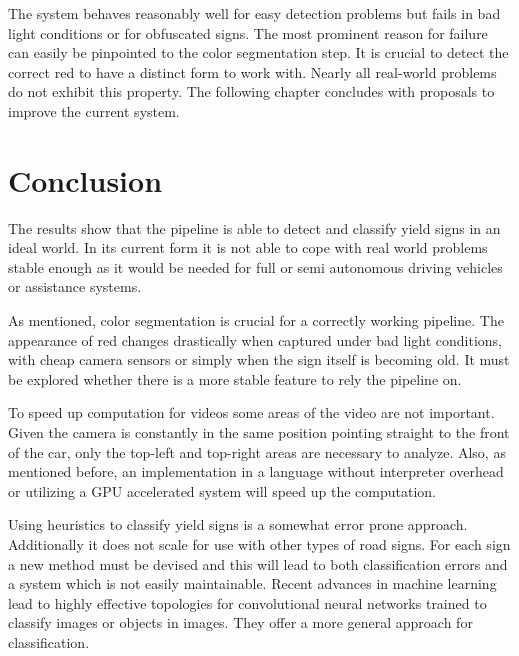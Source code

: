 \documentclass{report}
\begin{document}
The system behaves reasonably well for easy detection problems but
fails in bad light conditions or for obfuscated signs. The most
prominent reason for failure can easily be pinpointed to the color
segmentation step. It is crucial to detect the correct red to have a
distinct form to work with. Nearly all real-world problems do not
exhibit this property. The following chapter concludes with proposals
to improve the current system.


\pagebreak
\chapter{Conclusion}
\label{chap:conclusion}

The results show that the pipeline is able to detect and classify
yield signs in an ideal world. In its current form it is not able to
cope with real world problems stable enough as it would be needed for
full or semi autonomous driving vehicles or assistance systems.

As mentioned, color segmentation is crucial for a correctly working
pipeline. The appearance of red changes drastically when captured
under bad light conditions, with cheap camera sensors or simply when
the sign itself is becoming old. It must be explored whether there is
a more stable feature to rely the pipeline on.

To speed up computation for videos some areas of the video are not
important. Given the camera is constantly in the same position
pointing straight to the front of the car, only the top-left and
top-right areas are necessary to analyze. Also, as mentioned before,
an implementation in a language without interpreter overhead or
utilizing a GPU accelerated system will speed up the computation.

Using heuristics to classify yield signs is a somewhat error prone
approach. Additionally it does not scale for use with other types of
road signs. For each sign a new method must be devised and this will
lead to both classification errors and a system which is not easily
maintainable. Recent advances in machine learning lead to highly
effective topologies for convolutional neural networks trained to
classify images or objects in images. They offer a more general
approach for classification.
\end{document}
